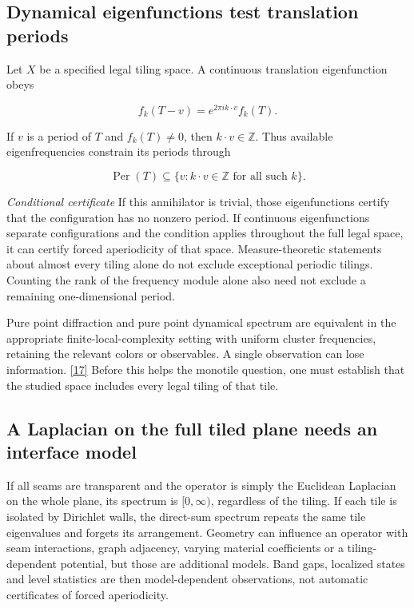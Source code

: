 \documentclass[11pt]{article}
\begin{document}
\subsection*{Dynamical eigenfunctions test translation periods}


Let \(X\) be a specified legal tiling space. A continuous translation eigenfunction obeys


\[ f_k(T-v)=e^{2\pi i k\cdot v}f_k(T). \]

If \(v\) is a period of \(T\) and \(f_k(T)\ne0\), then \(k\cdot v\in\mathbb Z\). Thus available eigenfrequencies constrain its periods through


\[ \operatorname{Per}(T)\subseteq\{v:k\cdot v\in\mathbb Z\text{ for all such }k\}. \]

\textit{Conditional certificate} If this annihilator is trivial, those eigenfunctions certify that the configuration has no nonzero period. If continuous eigenfunctions separate configurations and the condition applies throughout the full legal space, it can certify forced aperiodicity of that space. Measure-theoretic statements about almost every tiling alone do not exclude exceptional periodic tilings. Counting the rank of the frequency module alone also need not exclude a remaining one-dimensional period.



Pure point diffraction and pure point dynamical spectrum are equivalent in the appropriate finite-local-complexity setting with uniform cluster frequencies, retaining the relevant colors or observables. A single observation can lose information. \hyperlink{ref17}{[17]} Before this helps the monotile question, one must establish that the studied space includes every legal tiling of that tile.



\subsection*{A Laplacian on the full tiled plane needs an interface model}


If all seams are transparent and the operator is simply the Euclidean Laplacian on the whole plane, its spectrum is \([0,\infty)\), regardless of the tiling. If each tile is isolated by Dirichlet walls, the direct-sum spectrum repeats the same tile eigenvalues and forgets its arrangement. Geometry can influence an operator with seam interactions, graph adjacency, varying material coefficients or a tiling-dependent potential, but those are additional models. Band gaps, localized states and level statistics are then model-dependent observations, not automatic certificates of forced aperiodicity.
\end{document}
